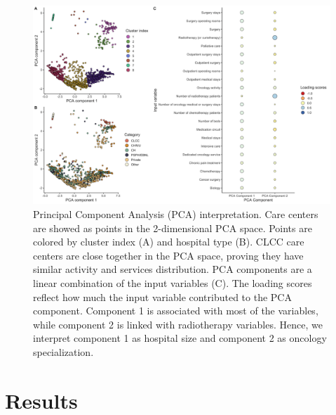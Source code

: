 \begin{figure}[h]
    \includegraphics[width=\textwidth]{images/camion/supplemental/sup_fig1_pca_and_clustering.png}
    \centering
    \caption{
        Principal Component Analysis (PCA) interpretation. Care centers are showed as points in the 2-dimensional PCA space. Points are colored by cluster index (A) and hospital type (B). CLCC care centers are close together in the PCA space, proving they have similar activity and services distribution. PCA components are a linear combination of the input variables (C). The loading scores reflect how much the input variable contributed to the PCA component. Component 1 is associated with most of the variables, while component 2 is linked with radiotherapy variables. Hence, we interpret component 1 as hospital size and component 2 as oncology specialization.
    }
    \label{fig:clustering-pca}
\end{figure}

\section{Results}

